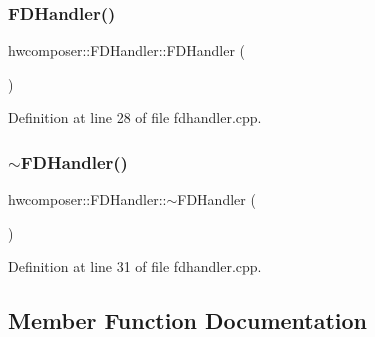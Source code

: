 \subsubsection{\texorpdfstring{F\+D\+Handler()}{FDHandler()}}
{\footnotesize\ttfamily hwcomposer\+::\+F\+D\+Handler\+::\+F\+D\+Handler (\begin{DoxyParamCaption}{ }\end{DoxyParamCaption})}



Definition at line 28 of file fdhandler.\+cpp.


\begin{DoxyCode}{0}
\end{DoxyCode}
\mbox{\label{classhwcomposer_1_1FDHandler_ace6e0ca1463839042229d717b9a2ae3a}} 
\subsubsection{\texorpdfstring{$\sim$\+F\+D\+Handler()}{~FDHandler()}}
{\footnotesize\ttfamily hwcomposer\+::\+F\+D\+Handler\+::$\sim$\+F\+D\+Handler (\begin{DoxyParamCaption}{ }\end{DoxyParamCaption})\hspace{0.3cm}{\ttfamily [virtual]}}



Definition at line 31 of file fdhandler.\+cpp.


\begin{DoxyCode}{0}
\end{DoxyCode}


\subsection{Member Function Documentation}
\mbox{\label{classhwcomposer_1_1FDHandler_aee421fa4ae54b7d4fcc352ebea15b4f8}} 
